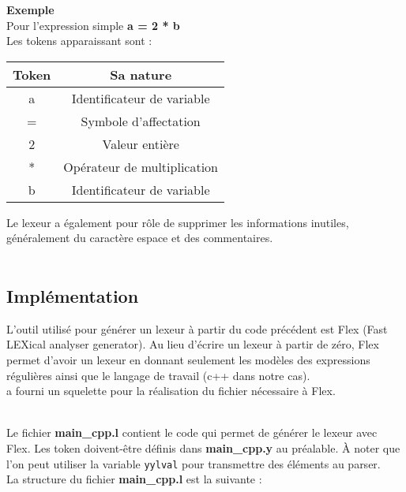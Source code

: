 \documentclass[a4paper]{article}%
\begin{document}
\textbf{Exemple} \\
    Pour l'expression simple \textbf{a = 2 * b} \\
    Les tokens apparaissant sont : \\
    \begin{center}
    \begin{tabular}{ | c | c | }
    \hline
    \textbf{Token} & \textbf{Sa nature} \\
    \hline
    a & Identificateur de variable \\
    \hline
    = & Symbole d'affectation \\
    \hline
    2 & Valeur entière \\
    \hline
    * & Opérateur de multiplication \\
    \hline
    b & Identificateur de variable \\
    \hline
\end{tabular}
\end{center}

Le lexeur a également pour rôle de supprimer les informations inutiles,
généralement du caractère espace et des commentaires.\\~\\%


\subsection{Implémentation}%

L'outil utilisé pour générer un lexeur à partir du code précédent est Flex (Fast
LEXical analyser generator). Au lieu d'écrire un lexeur à partir de zéro, Flex
permet d'avoir un lexeur en donnant seulement les modèles des expressions
régulières ainsi que le langage de travail (c++ dans notre cas).\\

\cite{compilerFlexBison} a fourni un squelette pour la réalisation du fichier
nécessaire à Flex.\\~\\

\noindent

Le fichier \textbf{main\_cpp.l} contient le code qui permet de générer le lexeur
avec Flex. Les token doivent-être définis dans \textbf{main\_cpp.y} au
préalable.
À noter que l'on peut utiliser la variable \lstinline{yylval} pour transmettre
des éléments au parser.\\

La structure du fichier \textbf{main\_cpp.l} est la suivante :
\end{document}
